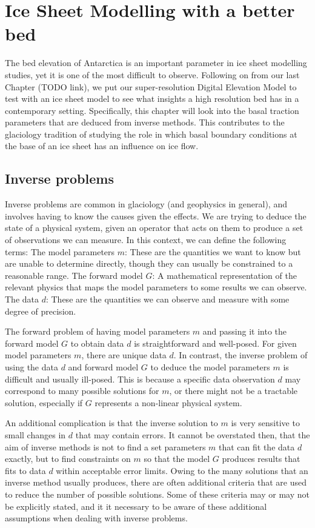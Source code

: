 
\section{Ice Sheet Modelling with a better bed}

The bed elevation of Antarctica is an important parameter in ice sheet modelling studies, yet it is one of the most difficult to observe.
Following on from our last Chapter (TODO link), we put our super-resolution Digital Elevation Model to test with an ice sheet model to see what insights a high resolution bed has in a contemporary setting.
Specifically, this chapter will look into the basal traction parameters that are deduced from inverse methods.
This contributes to the glaciology tradition of studying the role in which basal boundary conditions at the base of an ice sheet has an influence on ice flow.

\subsection{Inverse problems}

Inverse problems are common in glaciology (and geophysics in general), and involves having to know the causes given the effects.
We are trying to deduce the state of a physical system, given an operator that acts on them to produce a set of observations we can measure.
In this context, we can define the following terms:
The model parameters $m$: These are the quantities we want to know but are unable to determine directly, though they can usually be constrained to a reasonable range.
The forward model $G$: A mathematical representation of the relevant physics that maps the model parameters to some results we can observe.
The data $d$: These are the quantities we can observe and measure with some degree of precision.

The forward problem of having model parameters $m$ and passing it into the forward model $G$ to obtain data $d$ is straightforward and well-posed.
For given model parameters $m$, there are unique data $d$.
In contrast, the inverse problem of using the data $d$ and forward model $G$ to deduce the model parameters $m$ is difficult and usually ill-posed.
This is because a specific data observation $d$ may correspond to many possible solutions for $m$, or there might not be a tractable solution, especially if $G$ represents a non-linear physical system.

An additional complication is that the inverse solution to $m$ is very sensitive to small changes in $d$ that may contain errors.
It cannot be overstated then, that the aim of inverse methods is not to find a set parameters $m$ that can fit the data $d$ exactly, but to find constraints on $m$ so that the model $G$ produces results that fits to data $d$ within acceptable error limits.
Owing to the many solutions that an inverse method usually produces, there are often additional criteria that are used to reduce the number of possible solutions.
Some of these criteria may or may not be explicitly stated, and it it necessary to be aware of these additional assumptions when dealing with inverse problems.

